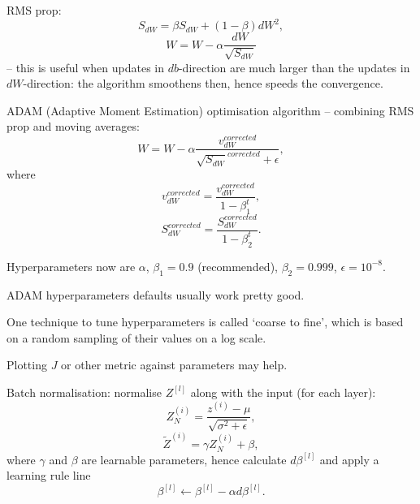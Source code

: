 \documentclass[a4paper,11pt]{article}
\begin{document}
RMS prop:
\begin{equation}
S_{dW} = \beta S_{dW} + \left(1 - \beta \right) dW^2 ,
\end{equation}
\begin{equation}
W = W - \alpha\frac{dW}{\sqrt{S_{dW}}}
\end{equation}
-- this is useful when updates in \textcolor{OliveGreen}{$db$}-direction are much larger than the updates in \textcolor{OliveGreen}{$dW$}-direction: the algorithm smoothens then, hence speeds the convergence.

ADAM (Adaptive Moment Estimation) optimisation algorithm -- combining RMS prop and moving averages:
\begin{equation}
W = W - \alpha\frac{v_{dW} ^{corrected}}{\sqrt{S_{dW}} ^{corrected} + \epsilon} ,
\end{equation}
where
\begin{equation}
v_{dW} ^{corrected} = \frac{v_{dW} ^{corrected}}{1 - \beta_1 ^t} ,
\end{equation}
\begin{equation}
S_{dW} ^{corrected} = \frac{S_{dW} ^{corrected}}{1 - \beta_2 ^t} .
\end{equation}

Hyperparameters now are \textcolor{OliveGreen}{$\alpha$}, \textcolor{OliveGreen}{$\beta_1 = 0.9$} (recommended), \textcolor{OliveGreen}{$\beta_2 = 0.999$}, \textcolor{OliveGreen}{$\epsilon = 10^{-8}$}.

ADAM hyperparameters defaults usually work pretty good.

One technique to tune hyperparameters is called `coarse to fine', which is based on a random sampling of their values on a log scale.

Plotting \textcolor{OliveGreen}{$J$} or other metric against parameters may help.

Batch normalisation: normalise \textcolor{OliveGreen}{$Z^{[l]}$} along with the input (for each layer):
\begin{equation}
Z_N ^{(i)} = \frac{z^{(i)} - \mu}{\sqrt{\sigma^2 + \epsilon}} ,
\end{equation}
\begin{equation}
\tilde{Z} ^{(i)} = \gamma Z_N ^{(i)} + \beta ,
\end{equation}
where \textcolor{OliveGreen}{$\gamma$} and \textcolor{OliveGreen}{$\beta$} are learnable parameters, hence calculate \textcolor{OliveGreen}{$d\beta^{[l]}$} and apply a learning rule line
\begin{equation}
\beta^{[l]} \leftarrow \beta^{[l]} - \alpha d\beta^{[l]} .
\end{equation}
\end{document}
